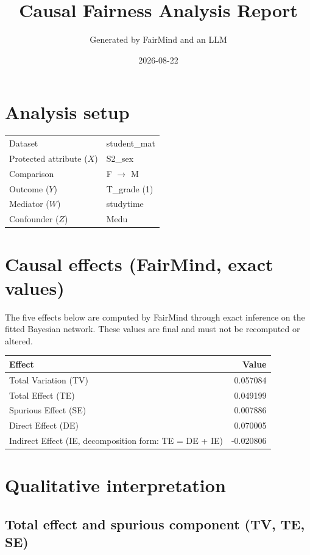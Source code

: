 \documentclass[11pt]{article}
\title{Causal Fairness Analysis Report}
\author{Generated by FairMind and an LLM}
\date{2026-08-22}
\begin{document}
\maketitle

\section{Analysis setup}

\begin{tabular}{ll}
\toprule
Dataset & student\_mat \\
Protected attribute ($X$) & S2\_sex \\
Comparison & F $\to$ M \\
Outcome ($Y$) & T\_grade (1) \\
Mediator ($W$) & studytime \\
Confounder ($Z$) & Medu \\
\bottomrule
\end{tabular}

\section{Causal effects (FairMind, exact values)}

The five effects below are computed by FairMind through exact inference on the
fitted Bayesian network. These values are final and must not be recomputed or
altered.

\begin{tabular}{lr}
\toprule
Effect & Value \\
\midrule
Total Variation (TV) & 0.057084 \\
Total Effect (TE) & 0.049199 \\
Spurious Effect (SE) & 0.007886 \\
Direct Effect (DE) & 0.070005 \\
Indirect Effect (IE, decomposition form: TE = DE + IE) & -0.020806 \\
\bottomrule
\end{tabular}

\section{Qualitative interpretation}

\subsection{Total effect and spurious component (TV, TE, SE)}
\end{document}
